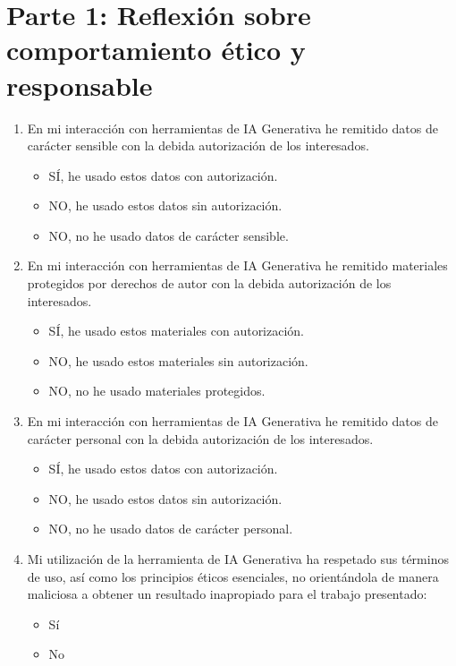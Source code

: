 \documentclass[12pt]{report} %
\begin{document}
\section*{Parte 1: Reflexión sobre comportamiento ético y responsable}
\begin{enumerate}
    \item En mi interacción con herramientas de IA Generativa he remitido datos de carácter sensible con la debida autorización de los interesados.
          \begin{itemize}
              \item[\ding{113}] SÍ, he usado estos datos con autorización.
              \item[\ding{113}] NO, he usado estos datos sin autorización.
              \item[\ding{51}] NO, no he usado datos de carácter sensible.
          \end{itemize}
    \item En mi interacción con herramientas de IA Generativa he remitido materiales protegidos por derechos de autor con la debida autorización de los interesados.
          \begin{itemize}
              \item[\ding{113}] SÍ, he usado estos materiales con autorización.
              \item[\ding{113}] NO, he usado estos materiales sin autorización.
              \item[\ding{51}] NO, no he usado materiales protegidos.
          \end{itemize}
    \item En mi interacción con herramientas de IA Generativa he remitido datos de carácter personal con la debida autorización de los interesados.
          \begin{itemize}
              \item[\ding{113}] SÍ, he usado estos datos con autorización.
              \item[\ding{113}] NO, he usado estos datos sin autorización.
              \item[\ding{51}] NO, no he usado datos de carácter personal.
          \end{itemize}
    \item Mi utilización de la herramienta de IA Generativa ha respetado sus términos de uso, así como los principios éticos esenciales, no orientándola de manera maliciosa a obtener un resultado inapropiado para el trabajo presentado:
          \begin{itemize}
              \item[\ding{51}] Sí
              \item[\ding{113}] No
          \end{itemize}
\end{enumerate}
\end{document}
